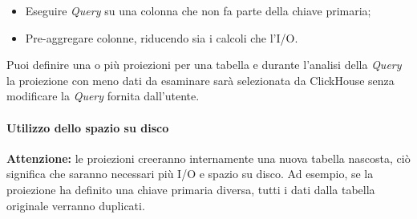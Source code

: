 \begin{itemize}
    \item Eseguire \textit{Query} su una colonna che non fa parte della chiave primaria;
    \item Pre-aggregare colonne, riducendo sia i calcoli che l'I/O.
\end{itemize}

Puoi definire una o più proiezioni per una tabella e durante l'analisi della \textit{Query} la proiezione con meno dati da esaminare sarà selezionata da ClickHouse senza modificare la \textit{Query} fornita dall'utente.

\paragraph*{Utilizzo dello spazio su disco}
\textbf{Attenzione:} le proiezioni creeranno internamente una nuova tabella nascosta, ciò significa che saranno necessari più I/O e spazio su disco. Ad esempio, se la proiezione ha definito una chiave primaria diversa, tutti i dati dalla tabella originale verranno duplicati.


